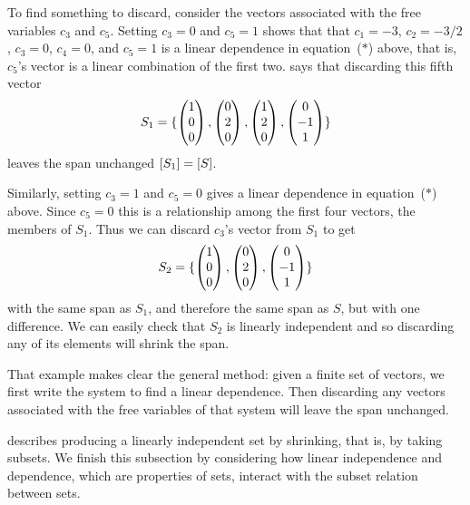 \begin{example}
To find something to discard, consider the vectors associated with the
free variables $c_3$ and $c_5$.
Setting \( c_3=0 \) and \( c_5=1 \)
shows that 
that $c_1=-3$, $c_2=-3/2$, $c_3=0$, $c_4=0$, and $c_5=1$ is a linear
dependence in equation~($*$) above, that is,
$c_5$'s vector is a linear combination of the first two.
 says that 
discarding this fifth vector
\begin{equation*}
  S_1=\mbox{$\{\begin{pmatrix} 1 \\ 0 \\ 0 \end{pmatrix},
     \begin{pmatrix} 0 \\ 2 \\ 0 \end{pmatrix},
     \begin{pmatrix} 1 \\ 2 \\ 0 \end{pmatrix},
     \begin{pmatrix} 0 \\ -1 \\ 1 \end{pmatrix}  \}$}
\end{equation*}
leaves the span unchanged $\relax [S_1\relax ]=\relax [S\relax ]$.

Similarly, setting \( c_3=1 \) and \( c_5=0 \)
gives a linear dependence in equation~($*$) above.
Since $c_5=0$ this is a relationship among the first four vectors,
the members of $S_1$.
Thus we can discard $c_3$'s vector from $S_1$ to get
\begin{equation*}
  S_2=\mbox{$\{\begin{pmatrix} 1 \\ 0 \\ 0 \end{pmatrix},
     \begin{pmatrix} 0 \\ 2 \\ 0 \end{pmatrix},
     \begin{pmatrix} 0 \\ -1 \\ 1 \end{pmatrix}  \}$}
\end{equation*}
with the same span as $S_1$, and therefore the same span as $S$, 
but with one difference.
We can easily check that $S_2$ is linearly independent  
and so discarding any of its elements will shrink the span.
\end{example}

That example makes clear the general method: 
given a finite set of vectors, we first
write the system to find a linear dependence.
Then discarding any vectors 
associated with the free variables of that system will leave the span
unchanged. 

 describes producing a linearly 
independent set by shrinking, that is, by taking subsets. 
We finish this subsection by considering
how linear independence and dependence, which are properties of sets, interact
with the subset relation between sets.

